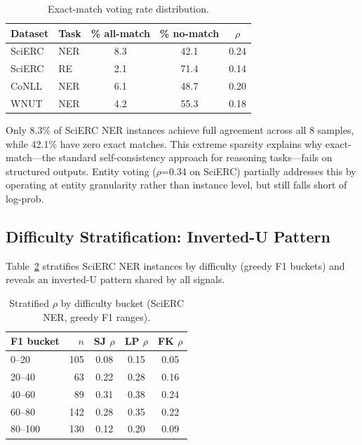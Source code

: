 \documentclass[11pt,a4paper]{article}
\begin{document}
\begin{table}[t]
\centering
\small
\caption{Exact-match voting rate distribution.}
\label{tab:exact_match}
\begin{tabular}{llccc}
\toprule
Dataset & Task & \% all-match & \% no-match & $\rho$ \\
\midrule
SciERC & NER & 8.3 & 42.1 & 0.24 \\
SciERC & RE  & 2.1 & 71.4 & 0.14 \\
CoNLL  & NER & 6.1 & 48.7 & 0.20 \\
WNUT   & NER & 4.2 & 55.3 & 0.18 \\
\bottomrule
\end{tabular}
\end{table}

Only 8.3\% of SciERC NER instances achieve full agreement across all 8 samples, while 42.1\% have zero exact matches. This extreme sparsity explains why exact-match---the standard self-consistency approach for reasoning tasks---fails on structured outputs. Entity voting ($\rho$=0.34 on SciERC) partially addresses this by operating at entity granularity rather than instance level, but still falls short of log-prob.

\subsection{Difficulty Stratification: Inverted-U Pattern}

Table~\ref{tab:stratification} stratifies SciERC NER instances by difficulty (greedy F1 buckets) and reveals an inverted-U pattern shared by all signals.

\begin{table}[t]
\centering
\small
\caption{Stratified $\rho$ by difficulty bucket (SciERC NER, greedy F1 ranges).}
\label{tab:stratification}
\begin{tabular}{lrccc}
\toprule
F1 bucket & $n$ & SJ $\rho$ & LP $\rho$ & FK $\rho$ \\
\midrule
0--20   & 105 & 0.08 & 0.15 & 0.05 \\
20--40  &  63 & 0.22 & 0.28 & 0.16 \\
40--60  &  89 & 0.31 & 0.38 & 0.24 \\
60--80  & 142 & 0.28 & 0.35 & 0.22 \\
80--100 & 130 & 0.12 & 0.20 & 0.09 \\
\bottomrule
\end{tabular}
\end{table}
\end{document}
